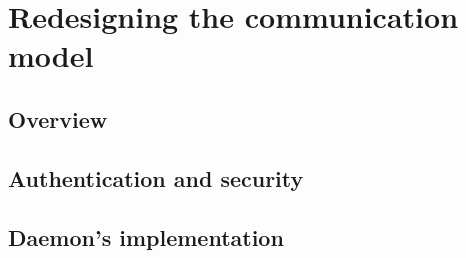 \chapter{Redesigning the communication model}
\label{chapter:virt-comm-model}


\section{Overview}
\label{sec:vmc-overview}

\section{Authentication and security}
\label{sec:vmc-auth}

\section{Daemon's implementation}
\label{sec:vmc-daemon}




